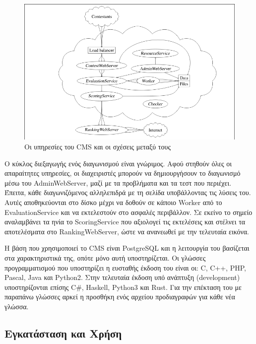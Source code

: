 \documentclass[diploma]{softlab-thesis}
\begin{document}
\begin{figure}
  \centering
  \includegraphics[scale=0.4,trim=4 4 4 4,clip]{Figures/cmsarchitecture.png}
  \caption[Η αρχιτεκτονική του CMS]{Οι υπηρεσίες του CMS και οι σχέσεις μεταξύ τους}
\end{figure}

\bigskip

Ο κύκλος διεξαγωγής ενός διαγωνισμού είναι γνώριμος. Αφού στηθούν όλες οι
απαραίτητες υπηρεσίες, οι διαχειριστές μπορούν να δημιουργήσουν το διαγωνισμό
μέσω του AdminWebServer, μαζί με τα προβλήματα και τα τεστ που περιέχει.
Έπειτα, κάθε διαγωνιζόμενος αλληλεπιδρά με τη σελίδα υποβάλλοντας τις λύσεις
του. Αυτές αποθηκεύονται στο δίσκο μέχρι να δοθούν σε κάποιο Worker από το
EvaluationService και να εκτελεστούν στο ασφαλές περιβάλλον. Σε εκείνο το
σημείο αναλαμβάνει τα ηνία το ScoringService που αξιολογεί τις εκτελέσεις και
στέλνει τα αποτελέσματα στο RankingWebServer, ώστε να ανανεωθεί με την
τελευταία εικόνα.

\bigskip

Η βάση που χρησιμοποιεί το CMS είναι PostgreSQL και η λειτουργία του βασίζεται
στα χαρακτηριστικά της, οπότε μόνο αυτή υποστηρίζεται. Οι γλώσσες προγραμματισμού
που υποστηρίζει η ευσταθής έκδοση του είναι οι: C, C++, PHP, Pascal, Java και
Python2. Στην τελευταία έκδοση υπό ανάπτυξη (development) υποστηρίζονται επίσης
C\#, Haskell, Python3 και Rust. Για την επέκταση του με παραπάνω γλώσσες αρκεί
η προσθήκη ενός αρχείου προδιαγραφών για κάθε νέα γλώσσα.


\subsection{Εγκατάσταση και Χρήση}
\end{document}
